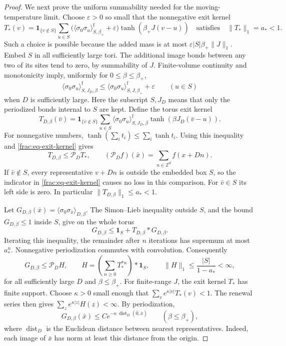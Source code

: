 \documentclass[11pt]{article}
\begin{document}
\begin{proof}
We next prove the uniform summability needed for the moving-temperature
limit. Choose \(\varepsilon>0\) so small that the nonnegative
exit kernel
\begin{equation}\label{frac:eq-exit-kernel}
 T_*(v)=\boldsymbol1_{\{v\notin S\}}
   \sum_{u\in S}
   \bigl(\langle\sigma_0\sigma_u\rangle^{\mathrm f}_{S,\beta_+}
                    +\varepsilon\bigr)
       \tanh(\beta_+J(v-u))
 \quad\text{satisfies}\quad \|T_*\|_1=a_*<1.
\end{equation}
Such a choice is possible because the added mass is at most
\(\varepsilon |S|\beta_+\|J\|_1\).
Embed \(S\) in all sufficiently large tori. The additional image
bonds between any two of its sites tend to zero, by summability
of \(J\). Finite-volume continuity and monotonicity imply,
uniformly for \(0\le\beta\le\beta_+\),
\[
 \langle\sigma_0\sigma_u\rangle^{\mathrm f}_{S,J_D,\beta}
 \le \langle\sigma_0\sigma_u\rangle^{\mathrm f}_{S,J,\beta_+}
                      +\varepsilon\qquad(u\in S)
\]
when \(D\) is sufficiently large. Here the subscript \(S,J_D\)
means that only the periodized bonds internal to \(S\) are kept.
Define the torus exit kernel
\[
 T_{D,\beta}(\bar v)=\boldsymbol1_{\{\bar v\notin S\}}
 \sum_{u\in S}
  \langle\sigma_0\sigma_u\rangle^{\mathrm f}_{S,J_D,\beta}
                         \tanh(\beta J_D(\bar v-u)).
\]
For nonnegative numbers, \(\tanh(\sum_i t_i)\le\sum_i\tanh t_i\).
Using this inequality and \eqref{frac:eq-exit-kernel} gives
\[
 T_{D,\beta}\le\mathcal P_DT_* ,\qquad
 (\mathcal P_Df)(\bar x)=\sum_{n\in\mathbb Z^d}f(x+Dn).
\]
If \(\bar v\notin S\), every representative \(v+Dn\) is
outside the embedded box \(S\), so the indicator in
\eqref{frac:eq-exit-kernel} causes no loss in this comparison.
For \(\bar v\in S\) its left side is zero.
In particular \(\|T_{D,\beta}\|_1\le a_*<1\).

Let \(G_{D,\beta}(\bar x)=
\langle\sigma_0\sigma_{\bar x}\rangle_{D,\beta}\).
The Simon--Lieb inequality outside \(S\), and the bound
\(G_{D,\beta}\le1\) inside \(S\), give on the whole torus
\[
 G_{D,\beta}\le\boldsymbol1_S+T_{D,\beta}*G_{D,\beta}.
\]
Iterating this inequality, the remainder after \(n\) iterations
has supremum at most \(a_*^n\). Nonnegative periodization
commutes with convolution. Consequently
\begin{equation}\label{frac:eq-renewal-envelope}
 G_{D,\beta}\le\mathcal P_DH,\qquad
 H=\left(\sum_{n\ge0}T_*^{*n}\right)*\boldsymbol1_S,
 \qquad \|H\|_1\le\frac{|S|}{1-a_*}<\infty,
\end{equation}
for all sufficiently large \(D\) and \(\beta\le\beta_+\).
For finite-range \(J\), the exit kernel \(T_*\) has finite support.
Choose \(\kappa>0\) small enough that
\(\sum_v e^{\kappa|v|}T_*(v)<1\). The renewal series then gives
\(\sum_z e^{\kappa|z|}H(z)<\infty\). By periodization,
\begin{equation}\label{eq:uniform-periodic-decay}
 G_{D,\beta}(\bar x)\le C e^{-\kappa\,\operatorname{dist}_D(\bar 0,\bar x)}
 \qquad(\beta\le\beta_+),
\end{equation}
where \(\operatorname{dist}_D\) is the Euclidean distance between
nearest representatives. Indeed, each image of \(\bar x\) has
norm at least this distance from the origin.


\end{proof}
\end{document}
